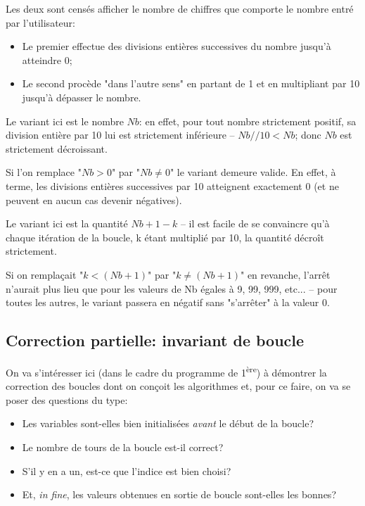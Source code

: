 \documentclass[12pt]{article}
\begin{document}
	\begin{MaReponse}
		\begin{alphenum}
			\item Les deux sont censés afficher le nombre de chiffres que comporte le nombre entré par l'utilisateur:
			\begin{itemize}
				\item Le premier effectue des divisions entières successives du nombre jusqu'à atteindre 0;
				\item Le second procède "dans l'autre sens" en partant de 1 et en multipliant par 10 jusqu'à dépasser le nombre.
			\end{itemize}
			\item Le variant ici est le nombre $Nb$: en effet, pour tout nombre strictement positif, sa division entière par 10 lui est strictement inférieure -- $Nb // 10 < Nb$; donc $Nb$ est strictement décroissant.
			\item Si l'on remplace "$Nb > 0$" par "$Nb \neq 0$" le variant demeure valide. En effet, à terme, les divisions entières successives par 10 atteignent exactement 0 (et ne peuvent en aucun cas devenir négatives).
			\item Le variant ici est la quantité $Nb + 1 - k$ -- il est facile de se convaincre qu'à chaque itération de la boucle, k étant multiplié par 10, la quantité décroît strictement.
			\item Si on remplaçait "$k < (Nb + 1)$" par "$k \neq (Nb + 1)$" en revanche, l'arrêt n'aurait plus lieu que pour les valeurs de Nb égales à 9, 99, 999, etc... -- pour toutes les autres, le variant passera en négatif sans "s'arrêter" à la valeur 0.
		\end{alphenum}
	\end{MaReponse}
	
	\subsection{Correction partielle: invariant de boucle}
	On va s'intéresser ici (dans le cadre du programme de 1\textsuperscript{ère}) à démontrer la correction des boucles dont on conçoit les algorithmes et, pour ce faire, on va se poser des questions du type:
	\begin{itemize}
		\item Les variables sont-elles bien initialisées \textit{avant} le début de la boucle?
		\item Le nombre de tours de la boucle est-il correct?
		\item S'il y en a un, est-ce que l'indice est bien choisi?
		\item Et, \textit{in fine}, les valeurs obtenues en sortie de boucle sont-elles les bonnes?
	\end{itemize}
	
\end{document}
